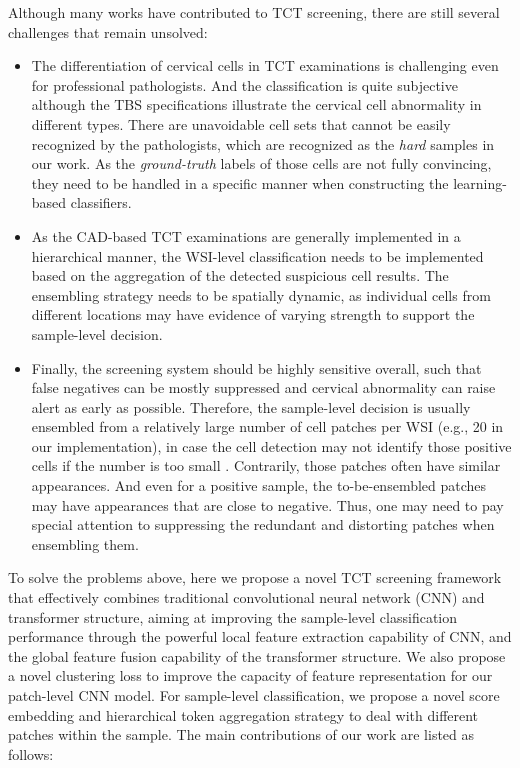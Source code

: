 
Although many works have contributed to TCT screening, there are still several challenges that remain unsolved: 

\begin{itemize}
    \item 
   The differentiation of cervical cells in TCT examinations is challenging even for professional pathologists. 
   And the classification is quite subjective although the TBS specifications illustrate the cervical cell abnormality in different types. There are unavoidable cell sets that cannot be easily recognized by the pathologists, which are recognized as the \textit{hard} samples in our work. As the \textit{ground-truth} labels of those cells are not fully convincing, they need to be handled in a specific manner when constructing the learning-based classifiers.
    \item 
    As the CAD-based TCT examinations are generally implemented in a hierarchical manner, the WSI-level classification needs to be implemented based on the aggregation of the detected suspicious cell results. The ensembling strategy needs to be spatially dynamic, as individual cells from different locations may have evidence of varying strength to support the sample-level decision.
    \item 
    Finally, the screening system should be highly sensitive overall, such that false negatives can be mostly suppressed and cervical abnormality can raise alert as early as possible. 
    Therefore, the sample-level decision is usually ensembled from a relatively large number of cell patches per WSI (e.g., 20 in our implementation), in case the cell detection may not identify those positive cells if the number is too small \cite{zhou2021hierarchical}. 
    Contrarily, those patches often have similar appearances. And even for a positive sample, the to-be-ensembled patches may have appearances that are close to negative. Thus, one may need to pay special attention to suppressing the redundant and distorting patches when ensembling them.
\end{itemize}


To solve the problems above, here we propose a novel TCT screening framework that effectively combines traditional convolutional neural network (CNN) and transformer structure, aiming at improving the sample-level classification performance through the powerful local feature extraction capability of CNN, and the global feature fusion capability of the transformer structure. We also propose a novel clustering loss to improve the capacity of feature representation for our patch-level CNN model. For sample-level classification, we propose a novel score embedding and hierarchical token aggregation strategy to deal with different patches within the sample. The main contributions of our work are listed as follows:  




